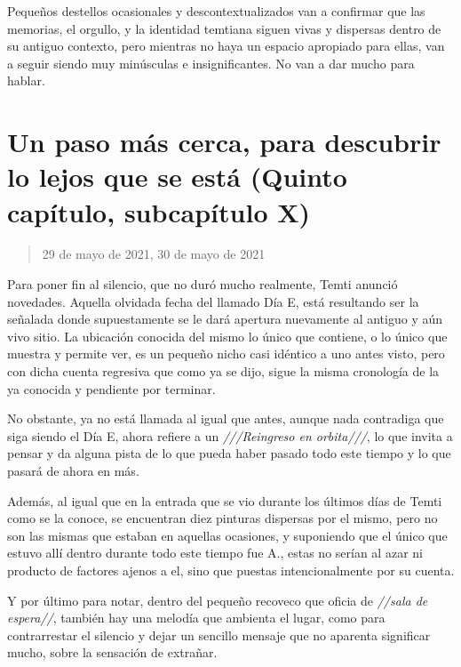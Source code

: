 \documentclass[
  spanish,
]{book}
\begin{document}
Pequeños destellos ocasionales y descontextualizados van a confirmar que las memorias, el orgullo, y la identidad temtiana siguen vivas y dispersas dentro de su antiguo contexto, pero mientras no haya un espacio apropiado para ellas, van a seguir siendo muy minúsculas e insignificantes. No van a dar mucho para hablar.

\hypertarget{un-paso-muxe1s-cerca-para-descubrir-lo-lejos-que-se-estuxe1-quinto-capuxedtulo-subcapuxedtulo-x}{%
\section{Un paso más cerca, para descubrir lo lejos que se está (Quinto capítulo, subcapítulo X)}\label{un-paso-muxe1s-cerca-para-descubrir-lo-lejos-que-se-estuxe1-quinto-capuxedtulo-subcapuxedtulo-x}}

\begin{quote}
29 de mayo de 2021, 30 de mayo de 2021
\end{quote}

Para poner fin al silencio, que no duró mucho realmente, Temti anunció novedades. Aquella olvidada fecha del llamado Día E, está resultando ser la señalada donde supuestamente se le dará apertura nuevamente al antiguo y aún vivo sitio. La ubicación conocida del mismo lo único que contiene, o lo único que muestra y permite ver, es un pequeño nicho casi idéntico a uno antes visto, pero con dicha cuenta regresiva que como ya se dijo, sigue la misma cronología de la ya conocida y pendiente por terminar.

No obstante, ya no está llamada al igual que antes, aunque nada contradiga que siga siendo el Día E, ahora refiere a un \emph{///Reingreso en orbita///}, lo que invita a pensar y da alguna pista de lo que pueda haber pasado todo este tiempo y lo que pasará de ahora en más.

Además, al igual que en la entrada que se vio durante los últimos días de Temti como se la conoce, se encuentran diez pinturas dispersas por el mismo, pero no son las mismas que estaban en aquellas ocasiones, y suponiendo que el único que estuvo allí dentro durante todo este tiempo fue A., estas no serían al azar ni producto de factores ajenos a el, sino que puestas intencionalmente por su cuenta.

Y por último para notar, dentro del pequeño recoveco que oficia de \emph{//sala de espera//}, también hay una melodía que ambienta el lugar, como para contrarrestar el silencio y dejar un sencillo mensaje que no aparenta significar mucho, sobre la sensación de extrañar.
\end{document}

